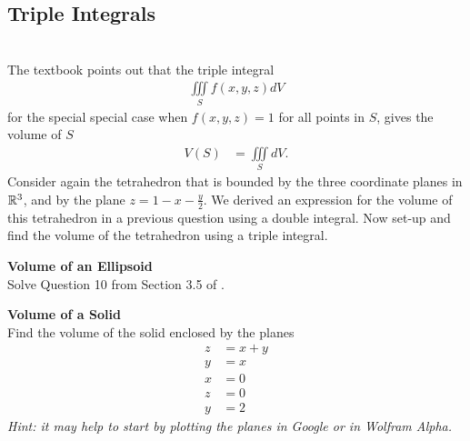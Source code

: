 \documentclass{article}
\begin{document}
\EEN %
\subsection{Triple Integrals}
  
\BEN
\item %
 \\
The textbook points out that the triple integral 
\begin{align*}
  \iiint\limits_S f(x,y,z) dV
\end{align*}
for the special special case when $f(x,y,z) = 1$ for all points in $S$, gives the volume of $S$
\begin{align*}
  V(S) &= \iiint\limits_S dV.
\end{align*}
Consider again the tetrahedron that is bounded by the three coordinate planes in $\mathbb{R}^3$, and by the plane $z = 1 - x - \frac{y}{2}$. We derived an expression for the volume of this tetrahedron in a previous question using a double integral. Now set-up and find the volume of the tetrahedron using a triple integral.
\item %
\textbf{Volume of an Ellipsoid}\\
Solve Question 10 from Section 3.5 of \VCT.
\item %
\textbf{Volume of a Solid}\\
Find the volume of the solid enclosed by the planes
\begin{align*}
  z & = x+y\\
  y &= x \\
  x &= 0 \\
  z &= 0 \\
  y &= 2
\end{align*}
\textit{Hint: it may help to start by plotting the planes in Google or in Wolfram Alpha.}
\EEN
\end{document}

